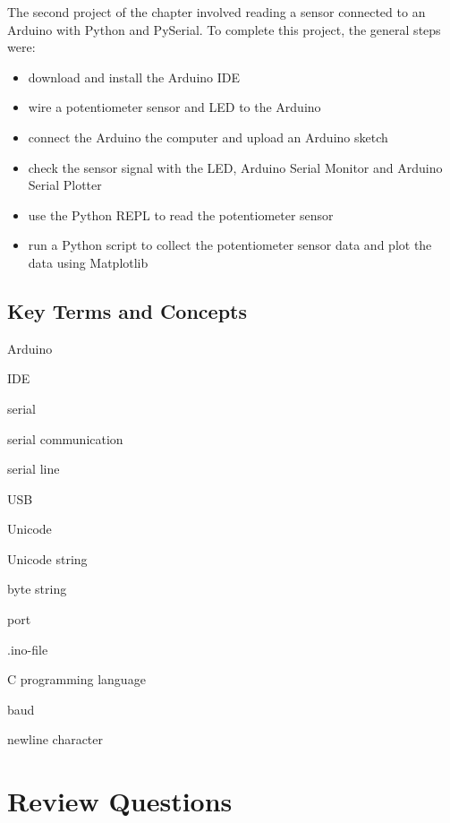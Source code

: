 \documentclass{book}
\newenvironment{key_terms}{\begin{multicols}{3}}{\end{multicols}} %
\providecommand{\tightlist}{%
      \setlength{\itemsep}{0pt}\setlength{\parskip}{0pt}}
\begin{document}
The second project of the chapter involved reading a sensor connected to
an Arduino with Python and PySerial. To complete this project, the
general steps were:

\begin{itemize}
\tightlist
\item
  download and install the Arduino IDE
\item
  wire a potentiometer sensor and LED to the Arduino
\item
  connect the Arduino the computer and upload an Arduino sketch
\item
  check the sensor signal with the LED, Arduino Serial Monitor and
  Arduino Serial Plotter
\item
  use the Python REPL to read the potentiometer sensor
\item
  run a Python script to collect the potentiometer sensor data and plot
  the data using Matplotlib
\end{itemize}
    




    
        \subsection{Key Terms and Concepts}\label{key-terms-and-concepts}
    




    
        \begin{key_terms}
        Arduino

IDE

serial

serial communication

serial line

USB

Unicode

Unicode string

byte string

port

.ino-file

C programming language

baud

newline character
        \end{key_terms}

    




    
        \section{Review Questions}\label{review-questions}
    
\end{document}
